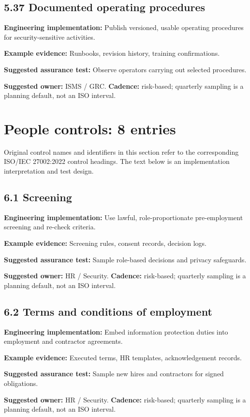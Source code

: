 \documentclass[11pt,letterpaper]{article}
\begin{document}
\subsection{5.37 Documented operating procedures}
\textbf{Engineering implementation:} Publish versioned, usable operating procedures for security-sensitive activities.\par
\textbf{Example evidence:} Runbooks, revision history, training confirmations.\par
\textbf{Suggested assurance test:} Observe operators carrying out selected procedures.\par
\textbf{Suggested owner:} ISMS / GRC. \textbf{Cadence:} risk-based; quarterly sampling is a planning default, not an ISO interval.\par
{}
\section{People controls: 8 entries}
\SourceTag Original control names and identifiers in this section refer to the corresponding ISO/IEC 27002:2022 control headings. The text below is an implementation interpretation and test design.\par
\subsection{6.1 Screening}
\textbf{Engineering implementation:} Use lawful, role-proportionate pre-employment screening and re-check criteria.\par
\textbf{Example evidence:} Screening rules, consent records, decision logs.\par
\textbf{Suggested assurance test:} Sample role-based decisions and privacy safeguards.\par
\textbf{Suggested owner:} HR / Security. \textbf{Cadence:} risk-based; quarterly sampling is a planning default, not an ISO interval.\par
{}
\subsection{6.2 Terms and conditions of employment}
\textbf{Engineering implementation:} Embed information protection duties into employment and contractor agreements.\par
\textbf{Example evidence:} Executed terms, HR templates, acknowledgement records.\par
\textbf{Suggested assurance test:} Sample new hires and contractors for signed obligations.\par
\textbf{Suggested owner:} HR / Security. \textbf{Cadence:} risk-based; quarterly sampling is a planning default, not an ISO interval.\par
{}
\end{document}
